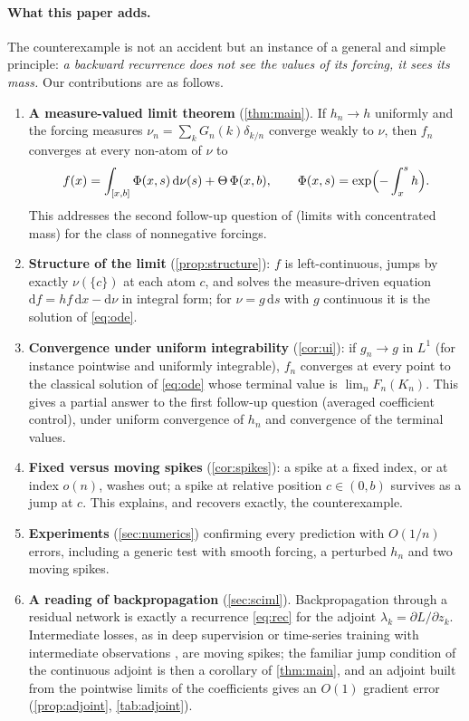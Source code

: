 \documentclass[11pt]{article}
\theoremstyle{definition}
\theoremstyle{remark}
\newcommand{\dd}{\,\mathrm{d}}
\newcommand{\1}{\mathbf{1}}
\begin{document}
\paragraph{What this paper adds.} The counterexample is not an accident but an instance of a
general and simple principle: \emph{a backward recurrence does not see the values of its
forcing, it sees its mass.} Our contributions are as follows.
\begin{enumerate}[leftmargin=2em,itemsep=2pt]
\item \textbf{A measure-valued limit theorem} (\cref{thm:main}). If $h_n\to h$ uniformly and
the forcing measures $\nu_n=\sum_k G_n(k)\delta_{k/n}$ converge weakly to $\nu$, then $f_n$
converges at every non-atom of $\nu$ to
\[
f(x)=\int_{[x,b]}\Phi(x,s)\dd\nu(s)+\Theta\,\Phi(x,b),\qquad \Phi(x,s)=\exp\Bigl(-\int_x^s h\Bigr).
\]
This addresses the second follow-up question of \cite{Pri26} (limits with concentrated mass)
for the class of nonnegative forcings.
\item \textbf{Structure of the limit} (\cref{prop:structure}): $f$ is left-continuous, jumps by
exactly $\nu(\{c\})$ at each atom $c$, and solves the measure-driven equation
$\mathrm{d}f=hf\dd x-\mathrm{d}\nu$ in integral form; for $\nu=g\dd s$ with $g$ continuous it is
the solution of \eqref{eq:ode}.
\item \textbf{Convergence under uniform integrability} (\cref{cor:ui}): if $g_n\to g$ in $L^1$
(for instance pointwise and uniformly integrable), $f_n$ converges at every point to the
classical solution of \eqref{eq:ode} whose terminal value is $\lim_nF_n(K_n)$. This gives a
partial answer to the first follow-up question (averaged coefficient control), under uniform
convergence of $h_n$ and convergence of the terminal values.
\item \textbf{Fixed versus moving spikes} (\cref{cor:spikes}): a spike at a fixed index, or at
index $o(n)$, washes out; a spike at relative position $c\in(0,b)$ survives as a jump at $c$.
This explains, and recovers exactly, the counterexample.
\item \textbf{Experiments} (\cref{sec:numerics}) confirming every prediction with
$O(1/n)$ errors, including a generic test with smooth forcing, a perturbed $h_n$ and two
moving spikes.
\item \textbf{A reading of backpropagation} (\cref{sec:sciml}). Backpropagation through a
residual network \cite{E17,HR18,CRBD18} is exactly a recurrence \eqref{eq:rec} for the adjoint
$\lambda_k=\partial L/\partial z_k$. Intermediate losses, as in deep supervision or time-series
training with intermediate observations \cite{RCD19}, are moving spikes; the familiar jump
condition of the continuous adjoint is then a corollary of \cref{thm:main}, and an adjoint built
from the pointwise limits of the coefficients gives an $O(1)$ gradient error
(\cref{prop:adjoint}, \cref{tab:adjoint}).
\end{enumerate}
\end{document}
